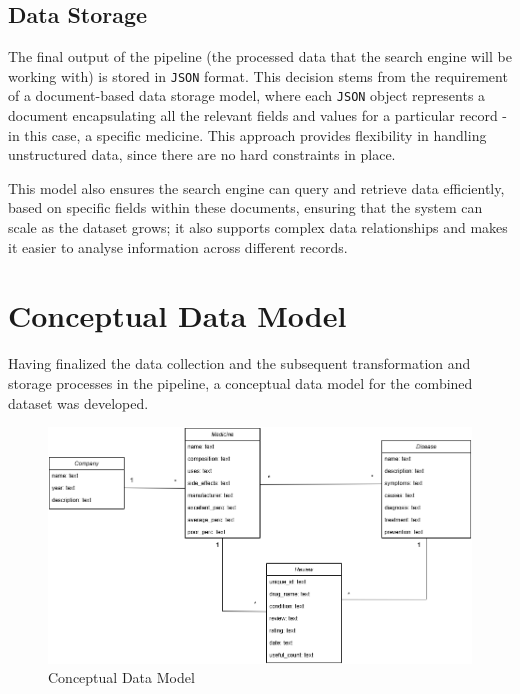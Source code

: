 \documentclass[sigconf]{acmart}
\begin{document}
\subsection{Data Storage}

The final output of the pipeline (the processed data that the search engine will be working with) is stored in \texttt{JSON} format. This decision stems from the requirement of a document-based data storage model, where each \texttt{JSON} object represents a document encapsulating all the relevant fields and values for a particular record - in this case, a specific medicine. This approach provides flexibility in handling unstructured data, since there are no hard constraints in place.

This model also ensures the search engine can query and retrieve data efficiently, based on specific fields within these documents, ensuring that the system can scale as the dataset grows; it also supports complex data relationships and makes it easier to analyse information across different records.

\section{Conceptual Data Model}

Having finalized the data collection and the subsequent transformation and storage processes in the pipeline, a conceptual data model for the combined dataset was developed.

\begin{figure}[H]
  \centering
  \includegraphics[width=\linewidth]{pri_uml_final.png}
  \caption{Conceptual Data Model}
  \label{fig:uml}
\end{figure}
\end{document}
